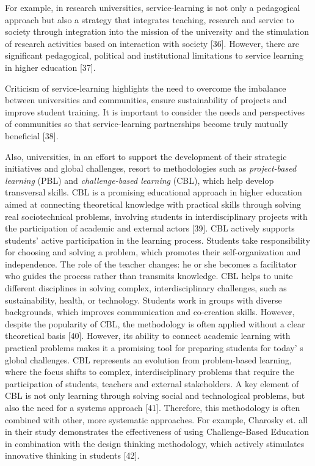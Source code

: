 For example, in research universities, service-learning is not only a
pedagogical approach but also a strategy that integrates teaching,
research and service to society through integration into the mission of
the university and the stimulation of research activities based on
interaction with society {[}36{]}. However, there are significant
pedagogical, political and institutional limitations to service learning
in higher education {[}37{]}.

Criticism of service-learning highlights the need to overcome the
imbalance between universities and communities, ensure sustainability of
projects and improve student training. It is important to consider the
needs and perspectives of communities so that service-learning
partnerships become truly mutually beneficial {[}38{]}.

Also, universities, in an effort to support the development of their
strategic initiatives and global challenges, resort to methodologies
such as \emph{project-based learning} (PBL) and \emph{challenge-based
learning} (CBL), which help develop transversal skills. CBL is a
promising educational approach in higher education aimed at connecting
theoretical knowledge with practical skills through solving real
sociotechnical problems, involving students in interdisciplinary
projects with the participation of academic and external actors
{[}39{]}. CBL actively supports students' active participation in the
learning process. Students take responsibility for choosing and solving
a problem, which promotes their self-organization and independence. The
role of the teacher changes: he or she becomes a facilitator who guides
the process rather than transmits knowledge. CBL helps to unite
different disciplines in solving complex, interdisciplinary challenges,
such as sustainability, health, or technology. Students work in groups
with diverse backgrounds, which improves communication and co-creation
skills. However, despite the popularity of CBL, the methodology is often
applied without a clear theoretical basis {[}40{]}. However, its ability
to connect academic learning with practical problems makes it a
promising tool for preparing students for today' s global
challenges. CBL represents an evolution from problem-based learning,
where the focus shifts to complex, interdisciplinary problems that
require the participation of students, teachers and external
stakeholders. A key element of CBL is not only learning through solving
social and technological problems, but also the need for a systems
approach {[}41{]}. Therefore, this methodology is often combined with
other, more systematic approaches. For example, Charosky et. all in
their study demonstrates the effectiveness of using Challenge-Based
Education in combination with the design thinking methodology, which
actively stimulates innovative thinking in students {[}42{]}.

